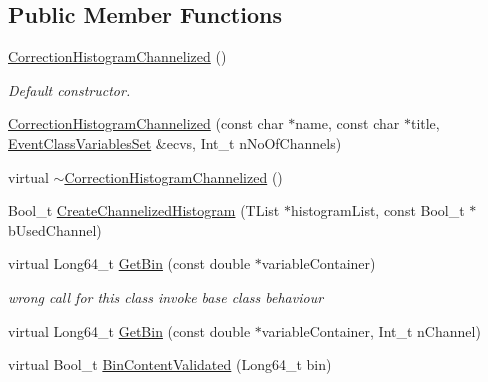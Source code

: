 \subsection*{Public Member Functions}
\begin{DoxyCompactItemize}
\item 
\mbox{\label{classQn_1_1CorrectionHistogramChannelized_a3f5045c2469a7eb1a34e545c2dd984ac}} 
\mbox{\hyperlink{classQn_1_1CorrectionHistogramChannelized_a3f5045c2469a7eb1a34e545c2dd984ac}{Correction\+Histogram\+Channelized}} ()
\begin{DoxyCompactList}\small\item\em Default constructor. \end{DoxyCompactList}\item 
\mbox{\hyperlink{classQn_1_1CorrectionHistogramChannelized_a89826506f8b6aa57a6352382a25f7ddc}{Correction\+Histogram\+Channelized}} (const char $\ast$name, const char $\ast$title, \mbox{\hyperlink{classQn_1_1EventClassVariablesSet}{Event\+Class\+Variables\+Set}} \&ecvs, Int\+\_\+t n\+No\+Of\+Channels)
\item 
virtual \mbox{\hyperlink{classQn_1_1CorrectionHistogramChannelized_adc080a267712de1ca2a04349bab92b4e}{$\sim$\+Correction\+Histogram\+Channelized}} ()
\item 
Bool\+\_\+t \mbox{\hyperlink{classQn_1_1CorrectionHistogramChannelized_a3dba90ec0d5dc2a4e346d52ed980f404}{Create\+Channelized\+Histogram}} (T\+List $\ast$histogram\+List, const Bool\+\_\+t $\ast$b\+Used\+Channel)
\item 
\mbox{\label{classQn_1_1CorrectionHistogramChannelized_ac0f40b2e62be4290571d9f55fb900058}} 
virtual Long64\+\_\+t \mbox{\hyperlink{classQn_1_1CorrectionHistogramChannelized_ac0f40b2e62be4290571d9f55fb900058}{Get\+Bin}} (const double $\ast$variable\+Container)
\begin{DoxyCompactList}\small\item\em wrong call for this class invoke base class behaviour \end{DoxyCompactList}\item 
virtual Long64\+\_\+t \mbox{\hyperlink{classQn_1_1CorrectionHistogramChannelized_a2491d6649af34766c3e848db8ed6e796}{Get\+Bin}} (const double $\ast$variable\+Container, Int\+\_\+t n\+Channel)
\item 
virtual Bool\+\_\+t \mbox{\hyperlink{classQn_1_1CorrectionHistogramChannelized_a12342a47b865927f259043f6816cf2e8}{Bin\+Content\+Validated}} (Long64\+\_\+t bin)

\end{DoxyCompactItemize}
